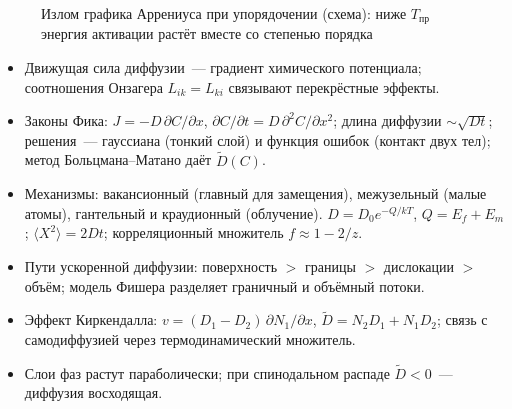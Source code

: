 \begin{figure}[ht]
\centering
{}
\caption{Излом графика Аррениуса при упорядочении (схема): ниже
$T_\text{пр}$ энергия активации растёт вместе со степенью порядка}
\label{fig:order-arrh}
\end{figure}

\begin{itogi}
\begin{itemize}
\item Движущая сила диффузии~— градиент химического потенциала;
соотношения Онзагера $L_{ik}=L_{ki}$ связывают перекрёстные эффекты.
\item Законы Фика: $J=-D\,\partial C/\partial x$,
$\partial C/\partial t=D\,\partial^2C/\partial x^2$; длина диффузии
$\sim\sqrt{Dt}$; решения~— гауссиана (тонкий слой) и функция ошибок
(контакт двух тел); метод Больцмана--Матано даёт $\widetilde D(C)$.
\item Механизмы: вакансионный (главный для замещения), межузельный
(малые атомы), гантельный и краудионный (облучение).
$D=D_0e^{-Q/kT}$, $Q=E_f+E_m$; $\langle X^2\rangle=2Dt$; корреляционный
множитель $f\approx1-2/z$.
\item Пути ускоренной диффузии: поверхность $>$ границы $>$ дислокации
$>$ объём; модель Фишера разделяет граничный и объёмный потоки.
\item Эффект Киркендалла: $v=(D_1-D_2)\,\partial N_1/\partial x$,
$\widetilde D=N_2D_1+N_1D_2$; связь с самодиффузией через
термодинамический множитель.
\item Слои фаз растут параболически; при спинодальном распаде $\widetilde
D<0$~— диффузия восходящая.
\end{itemize}
\end{itogi}

